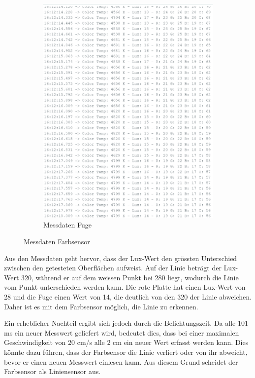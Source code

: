 \documentclass[../main.tex]{subfiles}
\begin{document}
\begin{figure}[H]
\begin{subfigure}{0.35\textwidth}
        \includegraphics[width=\linewidth]{img/sensortest/MD_Fuge_101ms.png}
        \caption{Messdaten Fuge}
        \label{fig:MDFarbsensorFuge}
    \end{subfigure}

    \caption{Messdaten Farbsensor}
    \label{fig:Testanordnungen}
\end{figure}

Aus den Messdaten geht hervor, dass der Lux-Wert den grössten Unterschied zwischen den getesteten Oberflächen aufweist. Auf der Linie beträgt der Lux-Wert 320, während er auf dem weissen Punkt bei 280 liegt, wodurch die Linie vom Punkt unterschieden werden kann. Die rote Platte hat einen Lux-Wert von 28 und die Fuge einen Wert von 14, die deutlich von den 320 der Linie abweichen. Daher ist es mit dem Farbsensor möglich, die Linie zu erkennen.

Ein erheblicher Nachteil ergibt sich jedoch durch die Belichtungszeit. Da alle 101 ms ein neuer Messwert geliefert wird, bedeutet dies, dass bei einer maximalen Geschwindigkeit von 20 cm/s alle 2 cm ein neuer Wert erfasst werden kann. Dies könnte dazu führen, dass der Farbsensor die Linie verliert oder von ihr abweicht, bevor er einen neuen Messwert einlesen kann. Aus diesem Grund scheidet der Farbsensor als Liniensensor aus.
\end{document}
